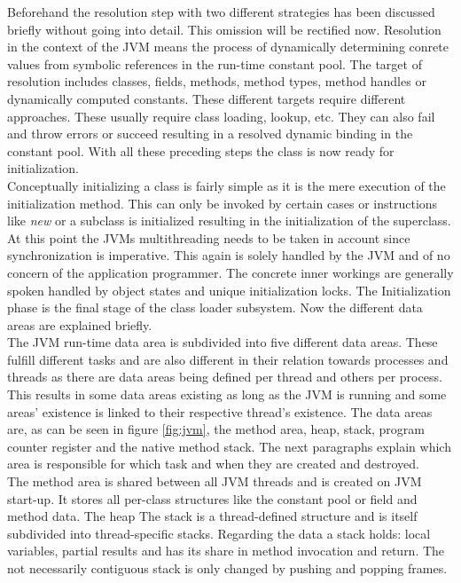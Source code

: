 Beforehand the resolution step with two different strategies has been discussed briefly without going into detail. This omission will be rectified now. Resolution in the context of the JVM means the process of dynamically determining conrete values from symbolic references in the run-time constant pool. The target of resolution includes classes, fields, methods, method types, method handles or dynamically computed constants. These different targets require different approaches. These usually require class loading, lookup, etc. They can also fail and throw errors or succeed resulting in a resolved dynamic binding in the constant pool. With all these preceding steps the class is now ready for initialization.\\
Conceptually initializing a class is fairly simple as it is the mere execution of the initialization method. This can only be invoked by certain cases or instructions like \emph{new} or a subclass is initialized resulting in the initialization of the superclass. At this point the JVMs multithreading needs to be taken in account since synchronization is imperative. This again is solely handled by the JVM and of no concern of the application programmer. The concrete inner workings are generally spoken handled by object states and unique initialization locks. The Initialization phase is the final stage of the class loader subsystem. Now the different data areas are explained briefly.\\
The JVM run-time data area is subdivided into five different data areas. These fulfill different tasks and are also different in their relation towards processes and threads as there are data areas being defined per thread and others per process. This results in some data areas existing as long as the JVM is running and some areas' existence is linked to their respective thread's existence. The data areas are, as can be seen in figure \ref{fig:jvm}, the method area, heap, stack, program counter register and the native method stack. The next paragraphs explain which area is responsible for which task and when they are created and destroyed.\\
The method area is shared between all JVM threads and is created on JVM start-up. It stores all per-class structures like the constant pool or field and method data.
The heap 
The stack is a thread-defined structure and is itself subdivided into thread-specific stacks. Regarding the data a stack holds: local variables, partial results and has its share in method invocation and return. The not necessarily contiguous stack is only changed by pushing and popping frames.
